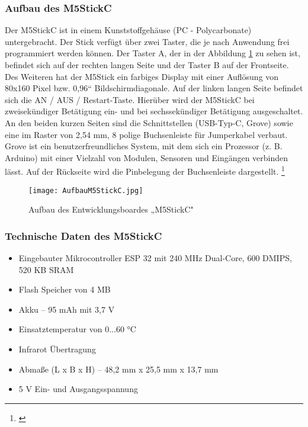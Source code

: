 \documentclass[a4paper,12pt]{article}
\begin{document}
\subsubsection{Aufbau des M5StickC}
Der M5StickC ist in einem Kunststoffgehäuse (PC - Polycarbonate) untergebracht. Der Stick verfügt über zwei Taster, die je nach Anwendung frei programmiert werden können. Der Taster A, der in der Abbildung \ref{AufbauM5StickC} zu sehen ist, befindet sich auf der rechten langen Seite und der Taster B auf der Frontseite. Des Weiteren hat der M5Stick ein farbiges Display mit einer Auflösung von 80x160 Pixel bzw. 0,96“ Bildschirmdiagonale. Auf der linken langen Seite befindet sich die AN / AUS / Restart-Taste. Hierüber wird der M5StickC bei zweisekündiger Betätigung ein- und bei sechssekündiger Betätigung ausgeschaltet.  An den beiden kurzen Seiten sind die Schnittstellen (USB-Typ-C, Grove) sowie eine im Raster von 2,54 mm, 8 polige Buchsenleiste für Jumperkabel verbaut. Grove ist ein benutzerfreundliches System, mit dem sich ein Prozessor (z. B. Arduino) mit einer Vielzahl von Modulen, Sensoren und Eingängen verbinden lässt. Auf der Rückseite wird die Pinbelegung der Buchsenleiste dargestellt. \footnote{\cite{M5STACK.}}

\begin{figure}[H]	%
\begin{center}
\texttt{[image: AufbauM5StickC.jpg]}
\caption{Aufbau des Entwicklungsboardes „M5StickC" \protect\cite{M5STACK.}}
\label{AufbauM5StickC}
\end{center}
\end{figure}

\newpage

\subsubsection{Technische Daten des M5StickC}
\begin{itemize}
\item Eingebauter Mikrocontroller ESP 32 mit 240 MHz Dual-Core, 600 DMIPS, 520 KB SRAM
\item Flash Speicher von 4 MB
\item Akku – 95 mAh mit 3,7 V
\item Einsatztemperatur von 0...60 °C
\item Infrarot Übertragung
\item Abmaße (L x B x H) – 48,2 mm x 25,5 mm x 13,7 mm
\item 5 V Ein- und Ausgangsspannung
\end{itemize}
\end{document}

